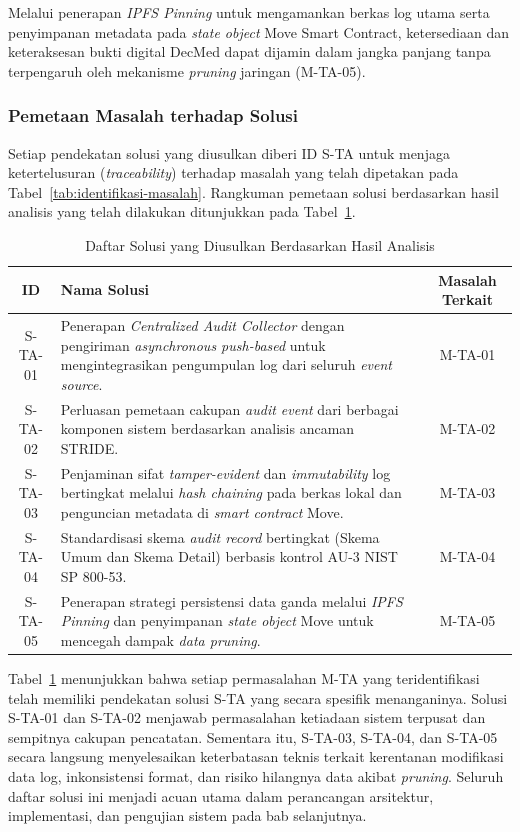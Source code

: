 Melalui penerapan \textit{IPFS Pinning} untuk mengamankan berkas log utama serta penyimpanan metadata pada \textit{state object} Move Smart Contract, ketersediaan dan keteraksesan bukti digital DecMed dapat dijamin dalam jangka panjang tanpa terpengaruh oleh mekanisme \textit{pruning} jaringan (M-TA-05).

\subsubsection{Pemetaan Masalah terhadap Solusi}

Setiap pendekatan solusi yang diusulkan diberi ID S-TA untuk menjaga ketertelusuran (\textit{traceability}) terhadap masalah yang telah dipetakan pada Tabel~\ref{tab:identifikasi-masalah}. Rangkuman pemetaan solusi berdasarkan hasil analisis yang telah dilakukan ditunjukkan pada Tabel~\ref{tab:pemetaan-masalah-solusi}.

\begin{table}[htbp]
\centering
\caption{Daftar Solusi yang Diusulkan Berdasarkan Hasil Analisis}
\label{tab:pemetaan-masalah-solusi}
\renewcommand{\arraystretch}{1.3}
\begin{tabular}{|c|p{8.5cm}|c|}
\hline
\textbf{ID} & \textbf{Nama Solusi} & \textbf{Masalah Terkait} \\ \hline
S-TA-01 & Penerapan \textit{Centralized Audit Collector} dengan pengiriman \textit{asynchronous push-based} untuk mengintegrasikan pengumpulan log dari seluruh \textit{event source}. & M-TA-01 \\ \hline
S-TA-02 & Perluasan pemetaan cakupan \textit{audit event} dari berbagai komponen sistem berdasarkan analisis ancaman STRIDE. & M-TA-02 \\ \hline
S-TA-03 & Penjaminan sifat \textit{tamper-evident} dan \textit{immutability} log bertingkat melalui \textit{hash chaining} pada berkas lokal dan penguncian metadata di \textit{smart contract} Move. & M-TA-03 \\ \hline
S-TA-04 & Standardisasi skema \textit{audit record} bertingkat (Skema Umum dan Skema Detail) berbasis kontrol AU-3 NIST SP 800-53. & M-TA-04 \\ \hline
S-TA-05 & Penerapan strategi persistensi data ganda melalui \textit{IPFS Pinning} dan penyimpanan \textit{state object} Move untuk mencegah dampak \textit{data pruning}. & M-TA-05 \\ \hline
\end{tabular}
\end{table}

Tabel~\ref{tab:pemetaan-masalah-solusi} menunjukkan bahwa setiap permasalahan M-TA yang teridentifikasi telah memiliki pendekatan solusi S-TA yang secara spesifik menanganinya. Solusi S-TA-01 dan S-TA-02 menjawab permasalahan ketiadaan sistem terpusat dan sempitnya cakupan pencatatan. Sementara itu, S-TA-03, S-TA-04, dan S-TA-05 secara langsung menyelesaikan keterbatasan teknis terkait kerentanan modifikasi data log, inkonsistensi format, dan risiko hilangnya data akibat \textit{pruning}. Seluruh daftar solusi ini menjadi acuan utama dalam perancangan arsitektur, implementasi, dan pengujian sistem pada bab selanjutnya.